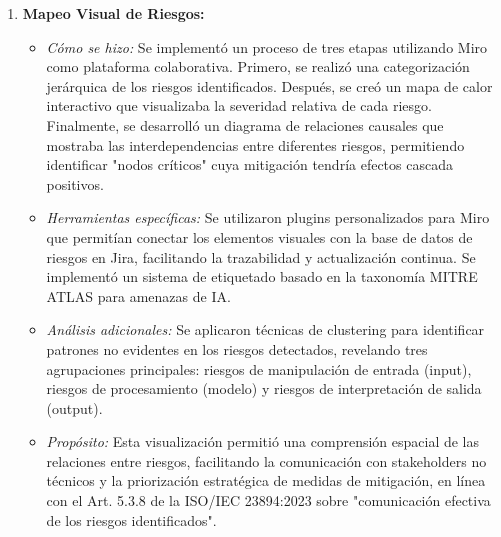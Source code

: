 \documentclass[12pt]{article}
\begin{document}
\begin{enumerate}
\begin{itemize}
            \item \textit{Herramientas utilizadas:} MISP (Malware Information Sharing Platform) para compartir e identificar amenazas conocidas, Mural para colaboración remota, y una matriz personalizada de análisis de riesgos basada en el marco FAIR (Factor Analysis of Information Risk) adaptado para IA.
            \item \textit{Resultados obtenidos:} Se identificaron 18 escenarios de riesgo adicionales no contemplados en la literatura, incluyendo 5 riesgos específicos para el contexto latinoamericano (como la interpretación errónea de jergas financieras locales que podrían llevar a consejos financieros incorrectos).
            \item \textit{Propósito:} Este enfoque participativo garantizó una visión holística de los riesgos, conforme al Art. 5.3.5 de la ISO/IEC 23894:2023 que enfatiza "la importancia de incluir diversas perspectivas en el proceso de identificación".
        \end{itemize}
    \item \textbf{Mapeo Visual de Riesgos:}
        \begin{itemize}
            \item \textit{Cómo se hizo:} Se implementó un proceso de tres etapas utilizando Miro como plataforma colaborativa. Primero, se realizó una categorización jerárquica de los riesgos identificados. Después, se creó un mapa de calor interactivo que visualizaba la severidad relativa de cada riesgo. Finalmente, se desarrolló un diagrama de relaciones causales que mostraba las interdependencias entre diferentes riesgos, permitiendo identificar "nodos críticos" cuya mitigación tendría efectos cascada positivos.
            \item \textit{Herramientas específicas:} Se utilizaron plugins personalizados para Miro que permitían conectar los elementos visuales con la base de datos de riesgos en Jira, facilitando la trazabilidad y actualización continua. Se implementó un sistema de etiquetado basado en la taxonomía MITRE ATLAS para amenazas de IA.
            \item \textit{Análisis adicionales:} Se aplicaron técnicas de clustering para identificar patrones no evidentes en los riesgos detectados, revelando tres agrupaciones principales: riesgos de manipulación de entrada (input), riesgos de procesamiento (modelo) y riesgos de interpretación de salida (output).
            \item \textit{Propósito:} Esta visualización permitió una comprensión espacial de las relaciones entre riesgos, facilitando la comunicación con stakeholders no técnicos y la priorización estratégica de medidas de mitigación, en línea con el Art. 5.3.8 de la ISO/IEC 23894:2023 sobre "comunicación efectiva de los riesgos identificados".
        \end{itemize}
\end{enumerate}
\end{document}
